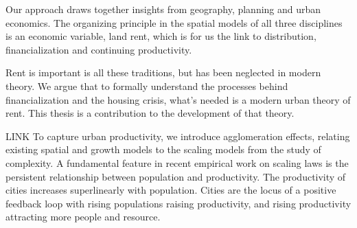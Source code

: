 Our approach draws together insights from %
geography, planning and urban economics. 
The organizing principle in the spatial models of all three disciplines is an economic variable, land rent, which is for us the link to distribution, financialization and continuing productivity. %

Rent is important is all these traditions, but has been neglected in modern theory. We argue that to formally understand the processes behind financialization and the housing crisis, what's needed is a modern urban theory of rent. This thesis is a contribution to the development of that theory. 

LINK
To capture urban productivity, we introduce %
agglomeration effects, relating existing spatial and growth models to the scaling models from the study of complexity. A fundamental feature in recent empirical work on scaling laws is %
the persistent relationship between population and productivity. The productivity of cities increases superlinearly with population. Cities are the locus of a positive feedback loop with rising populations raising productivity, and rising productivity attracting more people and resource.






